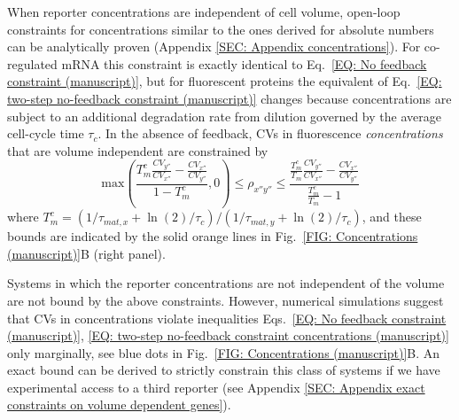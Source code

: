 \documentclass[%
 reprint,prx,
superscriptaddress,
%
%
%
%
%
%
%
%
%
 amsmath,amssymb,
 aps,
%
%
%
%
%
%
]{revtex4-2}
\begin{document}
{When reporter concentrations are independent of cell volume, open-loop constraints for concentrations similar to the ones derived for absolute numbers can be analytically proven (Appendix \ref{SEC: Appendix concentrations}).
%
%
For co-regulated mRNA this constraint is exactly identical to Eq.~\eqref{EQ: No feedback constraint (manuscript)}, but for fluorescent proteins the equivalent of Eq.~\eqref{EQ: two-step no-feedback constraint (manuscript)} changes because concentrations are subject to an additional degradation rate from dilution governed by the average cell-cycle time $\tau_{c}$. In the absence of feedback, CVs in fluorescence \emph{concentrations} that are volume independent are constrained by
\begin{equation}
\text{max}\left(\frac{T_{m}^{c}\frac{CV_{y''}}{CV_{x''}}-\frac{CV_{x''}}{CV_{y''}}}{1-T_m^{c}},0\right)  \leqslant \rho_{x''y''}\leqslant 
\frac{\frac{T_{m}^{c}}{T_{m}}\frac{CV_{y''}}{CV_{x''}} - \frac{CV_{x''}}{CV_{y''}}}{\frac{T_{m}^{c}}{T_{m}} - 1}
\label{EQ: two-step no-feedback constraint concentrations (manuscript)}
\end{equation}
where $T_{m}^{c} = (1/\tau_{mat,x} + \ln(2)/\tau_{c})/ (1/\tau_{mat,y} + \ln(2)/\tau_{c})$, and these bounds are indicated by the solid orange lines in Fig.~\ref{FIG: Concentrations (manuscript)}B (right panel).
}

{
Systems in which the reporter concentrations are not independent of the volume are not bound by the above constraints.
However, numerical simulations suggest that CVs in concentrations violate inequalities Eqs.~\eqref{EQ: No feedback constraint (manuscript)},
\eqref{EQ: two-step no-feedback constraint concentrations (manuscript)} only marginally, see blue dots in Fig.~\ref{FIG: Concentrations (manuscript)}B. An exact bound can be derived to strictly constrain this class of systems if we have experimental access to a third reporter (see Appendix \ref{SEC: Appendix exact constraints on volume dependent genes}).
}
\end{document}
